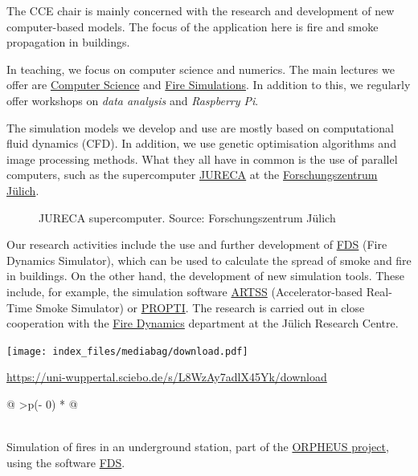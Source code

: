 \documentclass[
  letterpaper,
  DIV=11,
  numbers=noendperiod]{scrreprt}
\begin{document}
The CCE chair is mainly concerned with the research and development of
new computer-based models. The focus of the application here is fire and
smoke propagation in buildings.

In teaching, we focus on computer science and numerics. The main
lectures we offer are
\href{https://cce.uni-wuppertal.de/index.php?id=4178&L=0}{Computer
Science} and
\href{https://cce.uni-wuppertal.de/index.php?id=4185&L=0}{Fire
Simulations}. In addition to this, we regularly offer workshops on
\emph{data analysis} and \emph{Raspberry Pi}.

The simulation models we develop and use are mostly based on
computational fluid dynamics (CFD). In addition, we use genetic
optimisation algorithms and image processing methods. What they all have
in common is the use of parallel computers, such as the supercomputer
\href{https://www.fz-juelich.de/ias/jsc/EN/Expertise/Supercomputers/JURECA/JURECA_node.html}{JURECA}
at the
\href{https://fz-juelich.de/portal/DE/Home/home_node.html}{Forschungszentrum
Jülich}.

\begin{figure}


\caption{\label{fig-jureca}JURECA supercomputer. Source:
Forschungszentrum Jülich}

\end{figure}%

Our research activities include the use and further development of
\href{https://pages.nist.gov/fds-smv/}{FDS} (Fire Dynamics Simulator),
which can be used to calculate the spread of smoke and fire in
buildings. On the other hand, the development of new simulation tools.
These include, for example, the simulation software
\href{https://github.com/FireDynamics/ARTSS}{ARTSS} (Accelerator-based
Real-Time Smoke Simulator) or
\href{https://github.com/FireDynamics/propti}{PROPTI}. The research is
carried out in close cooperation with the
\href{https://www.fz-juelich.de/ias/ias-7/EN/Research/Fire_Dynamics/_node.html}{Fire
Dynamics} department at the Jülich Research Centre.

\texttt{[image: index\_files/mediabag/download.pdf]}

\url{https://uni-wuppertal.sciebo.de/s/L8WzAy7adlX45Yk/download}

\begin{longtable}[]{@{}
  >{\centering\arraybackslash}p{(\columnwidth - 0\tabcolsep) * }@{}}
\toprule\noalign{}
\begin{minipage}[b]{\linewidth}\centering
\end{minipage} \\
\midrule\noalign{}
\endhead
\bottomrule\noalign{}
\endlastfoot
Simulation of fires in an underground station, part of the
\href{http://www.orpheus-projekt.de}{ORPHEUS project}, using the
software \href{https://pages.nist.gov/fds-smv/}{FDS}. \\
\end{longtable}
\end{document}
